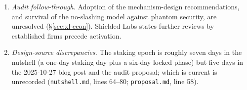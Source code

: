 \documentclass[11pt,a4paper]{article}
\theoremstyle{definition}
\begin{document}
\begin{enumerate}
  violations remains a non-adopted [Recommended] change
  (\S\ref{sec:xl-bounded}); long-range key hygiene improvements remain
  tfl-book issue \#140 (Remark~\ref{rem:xl-longrange}).
\item \emph{Audit follow-through.} Adoption of the mechanism-design
  recommendations, and survival of the no-slashing model against phantom
  security, are unresolved (\S\ref{sec:xl-econ}). Shielded Labs states
  further reviews by established firms precede activation.
\item \emph{Design-source discrepancies.} The staking epoch is roughly
  seven days in the nutshell (a one-day staking day plus a six-day locked
  phase) but five days in the 2025-10-27 blog post and the audit
  proposal; which is current is unrecorded
  (\texttt{nutshell.md}, lines 64--80; \texttt{proposal.md}, line 58).
\end{enumerate}

\end{document}

